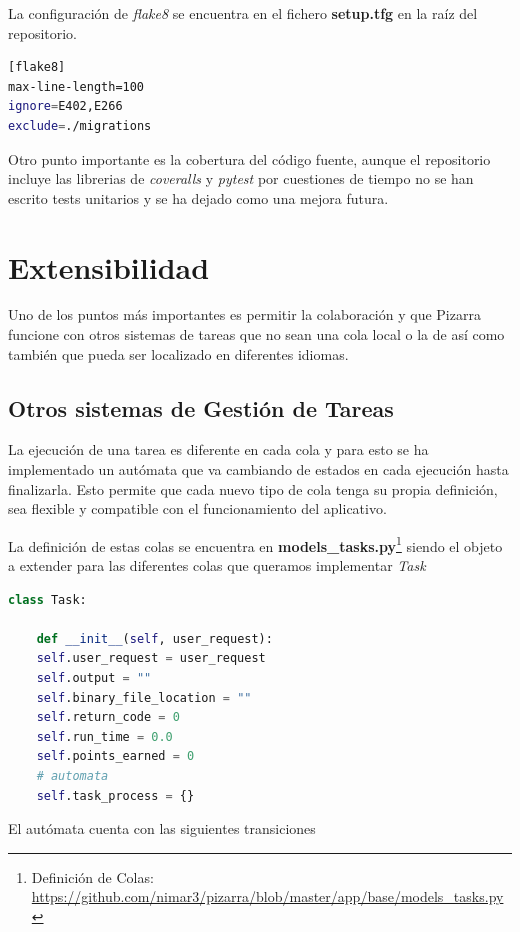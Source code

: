 \documentclass[11pt,spanish,listoffigures,listoftables]{tfgetsinf}
\begin{document}
La configuración de \textit{flake8} se encuentra en el fichero \textbf{setup.tfg} en la raíz del repositorio.

\begin{lstlisting}[language=bash]
[flake8]
max-line-length=100
ignore=E402,E266
exclude=./migrations
\end{lstlisting}

Otro punto importante es la cobertura del código fuente, aunque el repositorio incluye las librerias de \textit{coveralls} y \textit{pytest} por cuestiones de tiempo no se han escrito tests unitarios y se ha dejado como una mejora futura.

\chapter{Extensibilidad}

Uno de los puntos más importantes es permitir la colaboración y que Pizarra funcione con otros sistemas de tareas que no sean una \Gls{cola} local o la de \kahan así como también que pueda ser localizado en diferentes idiomas.

\section{Otros sistemas de Gestión de Tareas}

La ejecución de una tarea es diferente en cada \Gls{cola} y para esto se ha implementado un autómata que va cambiando de estados en cada ejecución hasta finalizarla. Esto permite que cada nuevo tipo de \Gls{cola} tenga su propia definición, sea flexible y compatible con el funcionamiento del aplicativo.

La definición de estas colas se encuentra en \textbf{models\_tasks.py}\footnote{Definición de Colas: \url{https://github.com/nimar3/pizarra/blob/master/app/base/models_tasks.py}} siendo el objeto a extender para las diferentes colas que queramos implementar \textit{Task}

\begin{lstlisting}[language=python]
class Task:

	def __init__(self, user_request):
	self.user_request = user_request
	self.output = ""
	self.binary_file_location = ""
	self.return_code = 0
	self.run_time = 0.0
	self.points_earned = 0
	# automata
	self.task_process = {}
\end{lstlisting}

El autómata cuenta con las siguientes transiciones
\end{document}
